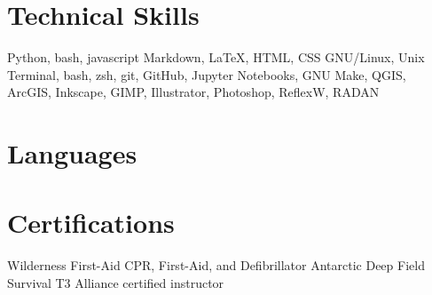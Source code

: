 \documentclass[a4paper,12pt,sans,colorlinks]{moderncv}
\begin{document}


\section{Technical Skills}

{
    Python, bash, javascript
}
{
    Markdown, LaTeX, HTML, CSS
}
{
    GNU/Linux, Unix Terminal, bash, zsh, git, GitHub, Jupyter
    Notebooks, GNU Make, QGIS, ArcGIS, Inkscape, GIMP,
    Illustrator, Photoshop, ReflexW, RADAN
}

\section{Languages}


\section{Certifications}

{
    Wilderness First-Aid
}
{
    CPR, First-Aid, and Defibrillator
}
{
    Antarctic Deep Field Survival
}
{
    T3 Alliance certified instructor
}
\end{document}
